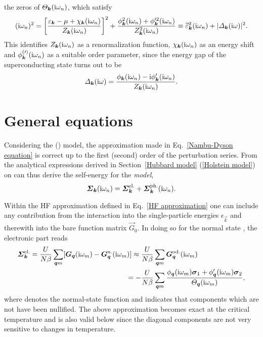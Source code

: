 the zeros of $\varTheta_{\boldsymbol k}(\mathrm i \omega_n)$, which satisfy
%
\begin{align*}
    (\mathrm i \omega_n)^2 = \left[ \frac
        {\varepsilon_{\boldsymbol k} - \mu + \chi_{\boldsymbol k}(\mathrm i \omega_n)}
        {Z_{\boldsymbol k}(\mathrm i \omega_n)}
    \right]^2
    + \frac
        {\phi_{\boldsymbol k}^2(\mathrm i \omega_n) + \phi'^2_{\boldsymbol k}(\mathrm i \omega_n)}
        {Z_{\boldsymbol k}^2(\mathrm i \omega_n)}
    \equiv \widetilde {\varepsilon}^2_{\boldsymbol k}(\mathrm i \omega_n)
    + |\varDelta_{\boldsymbol k}(\mathrm i \omega)|^2.
\end{align*}
%
This identifies $Z_{\boldsymbol k}(\mathrm i \omega_n)$ as a renormalization function,
$\chi_{\boldsymbol k}(\mathrm i \omega_n)$ as an energy shift and $\phi^{(\prime)}_{\boldsymbol k}(\mathrm i
\omega_n)$ as a suitable order parameter, since the energy gap of the
superconducting state turns out to be
%
\begin{align*}
    \varDelta_{\boldsymbol k}(\mathrm i \omega) = \frac
        {\phi_{\boldsymbol k}(\mathrm i \omega_n) - \mathrm i \phi'_{\boldsymbol k}(\mathrm i \omega_n)}
        {Z_{\boldsymbol k}(\mathrm i \omega_n)}.
\end{align*}

\section{General equations}

Considering the  () model, the approximation made
in Eq.~\ref{Nambu-Dyson equation} is correct up to the first (second) order of
the perturbation series. From the analytical expressions derived in
Section~\ref{Hubbard model} (\ref{Holstein model}) on can thus derive the
self-energy for the \emph{ model},
%
\begin{equation*}
    \boldsymbol {\varSigma}_{\boldsymbol k} (\mathrm i \omega_n)
    = \boldsymbol {\varSigma}_{\boldsymbol k} \sp{\text{el.}}
    + \boldsymbol {\varSigma}_{\boldsymbol k} \sp{\text{ph.}} (\mathrm i \omega_n).
\end{equation*}

Within the HF approximation defined in Eq.~\ref{HF approximation} one can
include any contribution from the  interaction into the
single-particle energies $\epsilon_{\vec k}$ and therewith into the bare
 function matrix $\vec G_0$. In doing so for the normal state
\cite[37]{AllenMitrovic82}, the electronic part reads
%
\begin{align*}
    \boldsymbol {\varSigma}_{\boldsymbol k} \sp{\text{el.}}
    = \frac{U}{N \beta} \sum_{\boldsymbol q m}
        [ \boldsymbol G_{\boldsymbol q} (\mathrm i \omega_m)
        - \boldsymbol G_{\boldsymbol q} \sp{\text{n.}} (\mathrm i \omega_m) ]
    \approx \frac{U}{N \beta} &\sum_{\boldsymbol q m}
        \boldsymbol G_{\boldsymbol q} \sp{\text{od.}} (\mathrm i \omega_m)
    \\
    = -\frac{U}{N \beta} &\sum_{\boldsymbol q m} \frac
        { \phi _{\boldsymbol q}(\mathrm i \omega_m) \boldsymbol \sigma_1
        + \phi'_{\boldsymbol q}(\mathrm i \omega_m) \boldsymbol \sigma_2 }
        {\varTheta_{\boldsymbol q}(\mathrm i \omega_m)},
\end{align*}
%
where  denotes the normal-state  function and 
indicates that components which are not  have been nullified.
The above approximation becomes exact at the critical temperature and is also
valid below \cite[38]{AllenMitrovic82} since the diagonal components are not
very sensitive to changes in temperature.

